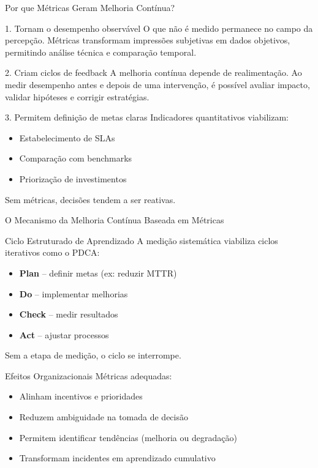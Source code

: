 \documentclass[9pt]{beamer}
\begin{document}
\begin{frame}{Por que Métricas Geram Melhoria Contínua?}

\begin{block}{1. Tornam o desempenho observável}
O que não é medido permanece no campo da percepção.
Métricas transformam impressões subjetivas em dados objetivos,
permitindo análise técnica e comparação temporal.
\end{block}

\begin{block}{2. Criam ciclos de feedback}
A melhoria contínua depende de realimentação.
Ao medir desempenho antes e depois de uma intervenção,
é possível avaliar impacto, validar hipóteses e corrigir estratégias.
\end{block}

\begin{block}{3. Permitem definição de metas claras}
Indicadores quantitativos viabilizam:
\begin{itemize}
    \item Estabelecimento de SLAs
    \item Comparação com benchmarks
    \item Priorização de investimentos
\end{itemize}
Sem métricas, decisões tendem a ser reativas.
\end{block}

\end{frame}
\begin{frame}{O Mecanismo da Melhoria Contínua Baseada em Métricas}

\begin{block}{Ciclo Estruturado de Aprendizado}
A medição sistemática viabiliza ciclos iterativos como o PDCA:

\begin{itemize}
    \item \textbf{Plan} – definir metas (ex: reduzir MTTR)
    \item \textbf{Do} – implementar melhorias
    \item \textbf{Check} – medir resultados
    \item \textbf{Act} – ajustar processos
\end{itemize}

Sem a etapa de medição, o ciclo se interrompe.
\end{block}

\begin{block}{Efeitos Organizacionais}
Métricas adequadas:
\begin{itemize}
    \item Alinham incentivos e prioridades
    \item Reduzem ambiguidade na tomada de decisão
    \item Permitem identificar tendências (melhoria ou degradação)
    \item Transformam incidentes em aprendizado cumulativo
\end{itemize}
\end{block}
\end{frame}
\end{document}
